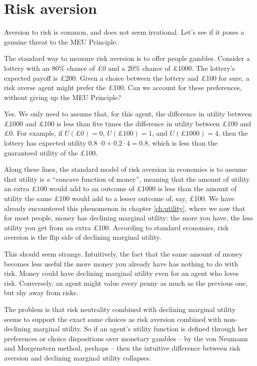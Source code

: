 \section{Risk aversion}

Aversion to risk is common, and does not seem irrational. Let's see if
it poses a genuine threat to the MEU Principle.

The standard way to measure risk aversion is to offer people gambles.
Consider a lottery with an 80\% chance of £0 and a 20\% chance of
£1000. The lottery's expected payoff is £200. Given a choice between
the lottery and £100 for sure, a risk averse agent might prefer the
£100. Can we account for these preferences, without giving up the MEU
Principle?

Yes. We only need to assume that, for this agent, the difference in
utility between £1000 and £100 is less than five times the difference
in utility between £100 and £0. For example, if $U(\text{£0}) = 0$,
$U(\text{£100}) = 1$, and $U(\text{£1000}) = 4$, then the lottery has
expected utility $0.8 \cdot 0 + 0.2 \cdot 4 = 0.8$, which is less than
the guaranteed utility of the £100.


Along these lines, the standard model of risk aversion in economics is
to assume that utility is a ``concave function of money'', meaning
that the amount of utility an extra £100 would add to an outcome of
£1000 is less than the amount of utility the same £100 would add to a
lesser outcome of, say, £100. We have already encountered this
phenomenon in chapter \ref{ch:utility}, where we saw that for most
people, money has declining marginal utility: the more you have, the
less utility you get from an extra £100. According to standard
economics, risk aversion is the flip side of declining marginal
utility.

This should seem strange. Intuitively, the fact that the same amount of
money becomes less useful the more money you already have has nothing
to do with risk. Money could have declining marginal utility even for
an agent who loves risk. Conversely, an agent might value every penny
as much as the previous one, but shy away from risks.

The problem is that risk neutrality combined with declining marginal
utility seems to support the exact same choices as risk aversion
combined with non-declining marginal utility. So if an agent's utility
function is defined through her preferences or choice dispositions
over monetary gambles -- by the von Neumann and Morgenstern method,
perhaps -- then the intuitive difference between risk aversion and
declining marginal utility collapses.

